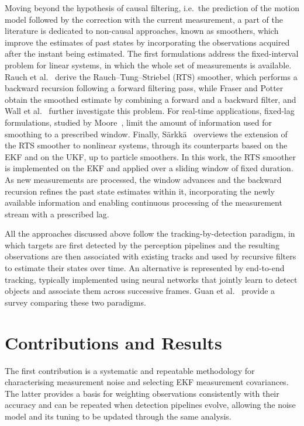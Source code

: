 Moving beyond the hypothesis of causal filtering, i.e.\ the prediction of the motion model followed by the correction with the current measurement, a part of the literature is dedicated to non-causal approaches, known as smoothers, which improve the estimates of past states by incorporating the observations acquired after the instant being estimated. The first formulations address the fixed-interval problem for linear systems, in which the whole set of measurements is available. Rauch et al.~\cite{rauch1965} derive the Rauch--Tung--Striebel (RTS) smoother, which performs a backward recursion following a forward filtering pass, while Fraser and Potter~\cite{fraser1969} obtain the smoothed estimate by combining a forward and a backward filter, and Wall et al.~\cite{wall1981} further investigate this problem. For real-time applications, fixed-lag formulations, studied by Moore~\cite{moore1973}, limit the amount of information used for smoothing to a prescribed window. Finally, S\"arkk\"a~\cite{sarkka2013book} overviews the extension of the RTS smoother to nonlinear systems, through its counterparts based on the EKF and on the UKF, up to particle smoothers. In this work, the RTS smoother is implemented on the EKF and applied over a sliding window of fixed duration. As new measurements are processed, the window advances and the backward recursion refines the past state estimates within it, incorporating the newly available information and enabling continuous processing of the measurement stream with a prescribed lag.

All the approaches discussed above follow the tracking-by-detection paradigm, in which targets are first detected by the perception pipelines and the resulting observations are then associated with existing tracks and used by recursive filters to estimate their states over time. An alternative is represented by end-to-end tracking, typically implemented using neural networks that jointly learn to detect objects and associate them across successive frames. Guan et al.~\cite{guan2025} provide a survey comparing these two paradigms.

\section{Contributions and Results}
\label{sec:intro_contributions}

The first contribution is a systematic and repeatable methodology for characterising measurement noise and selecting EKF measurement covariances. The latter provides a basis for weighting observations consistently with their accuracy and can be repeated when detection pipelines evolve, allowing the noise model and its tuning to be updated through the same analysis.

